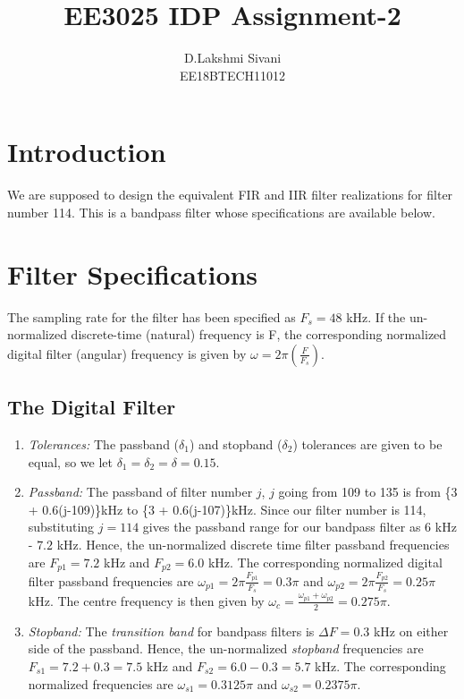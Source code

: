 \documentclass{article}
\begin{document}
\title{EE3025 IDP Assignment-2}

\author{D.Lakshmi Sivani \\EE18BTECH11012}

\maketitle
\section{Introduction}
We are supposed to design the equivalent FIR and IIR filter realizations for filter number 114.  
This is a bandpass filter whose specifications are available below.

\section{Filter Specifications}
The sampling rate for the filter has been specified as $F_s =  48$ kHz.	If the un-normalized  discrete-time (natural) frequency is F, the corresponding normalized digital filter (angular) frequency is given by $\omega = 2\pi
\left(\frac{F}{F_s}\right)$.

\subsection{The Digital Filter}

\begin{enumerate}
\item {\em Tolerances:}  The passband ($\delta_1$) and stopband ($\delta_2$) tolerances are given to
be equal, so we let $\delta_1 = \delta_2 = \delta = 0.15$.

\item {\em Passband:}  The passband of filter number $j$, $j$ going from 109 to 135 is from \{3 + 0.6(j-109)\}kHz
to \{3 + 0.6(j-107)\}kHz.  Since our filter number is 114, substituting $j = 114$ gives the passband
range for our bandpass filter as $6$ kHz - $7.2$ kHz.  Hence, the un-normalized discrete time filter
passband frequencies are $F_{p1} = 7.2$ kHz
and $F_{p2} = 6.0$ kHz.  The corresponding normalized digital filter passband frequencies are
$\omega_{p1} = 2\pi\frac{F_{p1}}{F_s}  = 0.3\pi$  and $\omega_{p2} = 2\pi\frac{F_{p2}}{F_s}  = 0.25 \pi$ kHz.  The centre frequency is then given by  $\omega_c = \frac{\omega_{p1} + \omega_{p2}}{2} = 0.275\pi$.  

\item {\em Stopband:}  The {\em transition band} for bandpass filters is $\Delta F = 0.3$ kHz on either side of the passband.
Hence, the un-normalized {\em stopband} frequencies are $F_{s1} = 7.2 + 0.3 = 7.5$ kHz and $F	_{s2} = 6.0 - 0.3 = 5.7$ kHz.  The corresponding normalized frequencies are $\omega_{s1} = 0.3125 \pi$  and $\omega_{s2} =  0.2375 \pi$.
\end{enumerate}
\end{document}
